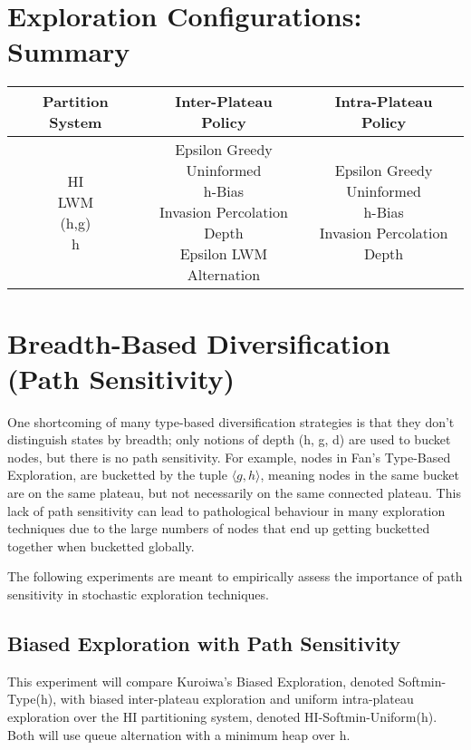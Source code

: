 \documentclass{article}
\theoremstyle{definition}
\begin{document}
\section{Exploration Configurations: Summary}
\begin{tabular}{ | c | c | c | } 
    \hline
    Partition System & Inter-Plateau Policy & Intra-Plateau Policy \\
    \hline
    \makecell{HI\\LWM\\(h,g)\\h}& \makecell{Epsilon Greedy\\Uninformed\\h-Bias\\Invasion Percolation\\Depth\\Epsilon LWM\\Alternation} & \makecell{Epsilon Greedy\\Uninformed\\h-Bias\\Invasion Percolation\\Depth} \\ 
    \hline
\end{tabular}

\section{Breadth-Based Diversification (Path Sensitivity)}
One shortcoming of many type-based diversification strategies is that they don't distinguish states by breadth; only notions of depth (h, g, d) are used to bucket nodes, but there is no path sensitivity. For example, nodes in Fan's Type-Based Exploration, are bucketted by the tuple $\langle g, h \rangle$, meaning nodes in the same bucket are on the same plateau, but not necessarily on the same connected plateau. This lack of path sensitivity can lead to pathological behaviour in many exploration techniques due to the large numbers of nodes that end up getting bucketted together when bucketted globally. 

The following experiments are meant to empirically assess the importance of path sensitivity in stochastic exploration techniques.

\subsection{Biased Exploration with Path Sensitivity}
This experiment will compare Kuroiwa's Biased Exploration, denoted Softmin-Type(h), with biased inter-plateau exploration and uniform intra-plateau exploration over the HI partitioning system, denoted HI-Softmin-Uniform(h). Both will use queue alternation with a minimum heap over h.  
\end{document}
